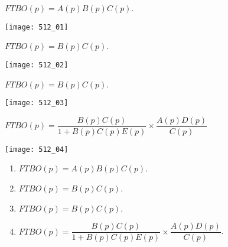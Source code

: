 \normaltrue \difficilefalse \tdifficilefalse
\correctiontrue


\setcounter{question}{0}%

\ifcorrection
\else
{}
\fi


\ifprof 
$FTBO(p) = A(p) B(p) C(p)$.
\else
\begin{marginfigure}
\texttt{[image: 512\_01]}
\end{marginfigure}
\fi
 

\ifprof 
$FTBO(p) = B(p) C(p)$.
\else
\begin{marginfigure}
\texttt{[image: 512\_02]}
\end{marginfigure}
\fi


\ifprof 
$FTBO(p) = B(p) C(p)$.
\else
\begin{marginfigure}
\texttt{[image: 512\_03]}
\end{marginfigure}
\fi


\ifprof 
$ FTBO(p) = \dfrac{B(p) C(p)}{1+B(p) C(p) E(p)} \times \dfrac{A(p) D(p)}{C(p)}$ 
\else
\begin{marginfigure}
\texttt{[image: 512\_04]}
\end{marginfigure}
\fi






\ifprof
\else
{}
\begin{solution}
\begin{enumerate}
\item $FTBO(p) = A(p) B(p) C(p)$.
\item $FTBO(p) = B(p) C(p)$.
\item $FTBO(p) = B(p) C(p)$.
\item $FTBO(p) = \dfrac{B(p) C(p)}{1+B(p) C(p) E(p)} \times \dfrac{A(p) D(p)}{C(p)}$.
\end{enumerate}
\end{solution}

\fi